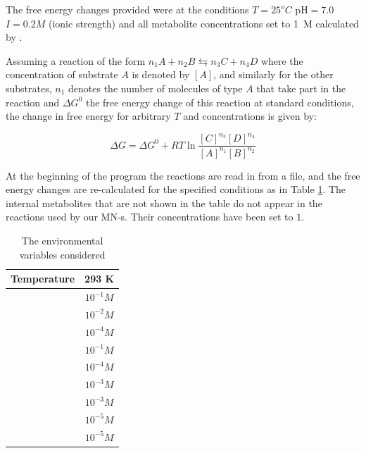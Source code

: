 \documentclass[a4paper,12pt]{article}
\begin{document}
	The free energy changes provided were at the conditions $T=25 ^o C$ pH$=7.0$ $I=0.2 M$ (ionic strength) and all metabolite concentrations set to 1~M calculated by \cite{BartekLower}. 
	
	Assuming a reaction of the form $n_1A + n_2B \leftrightarrows n_3C + n_4D$ where the concentration of substrate $A$ is denoted by $[A]$, and similarly for the other substrates, $n_1$ denotes the number of molecules of type $A$ that take part in the reaction and $\Delta G^0$ the free energy change of this reaction at standard conditions, the change in free energy for arbitrary $T$ and concentrations is given by: 
	
	\begin{equation}\label{eq:freeechange}
		\Delta G = \Delta G^0 + R T \ln \frac{[C]^{n_3}[D]^{n_4}}{[A]^{n_1}[B]^{n_2}}
	\end{equation}
	
	At the beginning of the program the reactions are read in from a file, and the free energy changes are re-calculated for the specified conditions as in Table \ref{environmentTable}. The internal metabolites that are not shown in the table do not appear in the reactions used by our MN-s. Their concentrations have been set to $1$. 
	
	\begin{table}
		\centering
	\begin{tabular}{|c|c|}
		
		\hline Temperature & 293 K \\ 
		\hline [ATP] & $10^{-1} M$ \\ 
		\hline [ADP] & $10^{-2} M$ \\ 
		\hline [AMP] & $10^{-4} M$ \\ 
		\hline [NAD$^+$] & $10^{-1} M$ \\ 
		\hline [NADH] & $10^{-4} M$ \\ 
		\hline [Pi] & $10^{-3} M$\\ 
		\hline [PPi] & $10^{-3} M$ \\ 
		\hline [CO$_2$] & $10^{-5} M$ \\ 
		\hline [NH$_3$] & $10^{-5} M$ \\ 

		\hline 
	\end{tabular} 
	\caption{The environmental variables considered}
	\label{environmentTable}
	\end{table}
\end{document}
